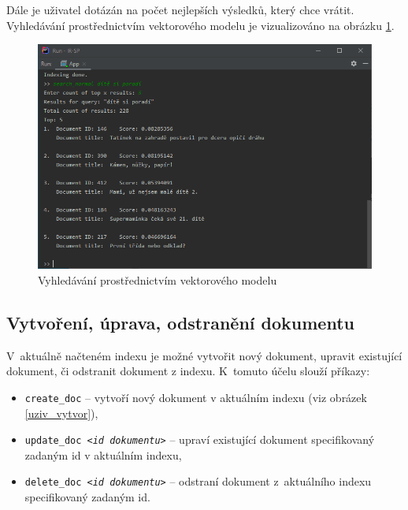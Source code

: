 \documentclass[
11pt,
a4paper,
pdftex,
czech,
titlepage
]{report}
\begin{document}
Dále je uživatel dotázán na počet nejlepších výsledků, který chce vrátit. Vyhledávání prostřednictvím vektorového modelu je vizualizováno na obrázku \ref{uziv_vyhled}.

\begin{figure}[!ht]
	\centering
	\includegraphics[width=1\textwidth]{img/vyhledavani.png}
	\caption{Vyhledávání prostřednictvím vektorového modelu}
	\label{uziv_vyhled}
\end{figure}

\subsection{Vytvoření, úprava, odstranění dokumentu}\label{CRUD}
V~aktuálně načteném indexu je možné vytvořit nový dokument, upravit existující dokument, či odstranit dokument z indexu. K~tomuto účelu slouží příkazy:

\begin{itemize}
    \item \texttt{create\_doc} -- vytvoří nový dokument v aktuálním indexu (viz obrázek \ref{uziv_vytvor}),
    \item \texttt{update\_doc <\textit{id dokumentu}>} -- upraví existující dokument specifikovaný zadaným id v aktuálním indexu,
    \item \texttt{delete\_doc <\textit{id dokumentu}>} -- odstraní dokument z~aktuálního indexu specifikovaný zadaným id.
    
\end{itemize}
\end{document}
